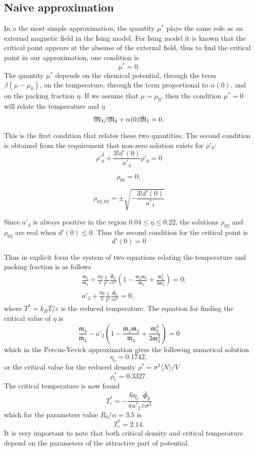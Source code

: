 \subsection{Naive approximation}
In a the most simple approximation, the quantity $\mu^*$ plays the same role as an external magnetic field in the Ising model. For Ising model it is known that the critical point appears at the absense of the external field, thus to find the critical point in our approximation, one condition is 
$$\mu^*=0.$$ 
The quantity $\mu^*$ depends on the chemical potential, through the term $\beta(\mu - \mu_0)$, on the temperature, through the term proportional to $\alpha(0)$, and on the packing fraction $\eta.$
If we assume that $\mu = \mu_0$, then the condition $\mu^*=0$ will relate the temperature and $\eta$
$$
{\frak M_3}/{\frak M_4} + \alpha(0)\tilde{\frak M}_1 = 0.
$$


This is the first condition that relates these two quantities.
The second condition is obtained from the requirement that non-zero solution exists for $\rho'_0$:
$$ {\rho'}^3_0 + \frac{3!d'(0)}{a'_4}{\rho'}_0 = 0 $$

$$
\rho_{01} = 0;
$$ 

$$
\rho_{02,03} = \pm\sqrt{-\frac{3!d'(0)}{a'_4}}
$$

Since $a'_4$ is always positive in the region $0.04 \leq \eta \leq 0.22$, the solutions $\rho_{02}$ and $\rho_{03}$ are real when $d'(0) \leq 0$. Thus the second condition for the critical point is 
$$
d'(0) = 0
$$

Thus in explicit form the system of two equations relating the temperature and packing fraction is as follows
\begin{eqnarray}
	&&\frac{\mathfrak{m}_3}{\mathfrak{m}_4} + \frac{6\eta}{\pi} \frac{1}{T^*} \frac{\hat{\Phi}_0}{\varepsilon\sigma^3}
	\left(1 - \frac{\mathfrak{m}_2\mathfrak{m}_3}{\mathfrak{m}_4} + \frac{\mathfrak{m}_3^3}{3\mathfrak{m}_4^2} \right) = 0;
	\nonumber\\
	&& a'_2 + \frac{6\eta}{\pi} \frac{1}{T^*} \frac{\hat{\Phi}_0}{\varepsilon\sigma^3} = 0,
\end{eqnarray}
where $T^* = k_BT/\varepsilon$ is the reduced temperature.
The equation for finding the critical value of $\eta$ is 
\begin{equation}
	\frac{\mathfrak{m}_3}{\mathfrak{m}_4} - a'_2
	\left(1 - \frac{\mathfrak{m}_2\mathfrak{m}_3}{\mathfrak{m}_4} + \frac{\mathfrak{m}_3^3}{3\mathfrak{m}_4^2} \right) = 0
\end{equation}
which in the Percus-Yevick approximation gives the following numerical solution
$$
\eta_c = 0.1742,
$$
or the critical value for the reduced density $\rho^* = \sigma^3\langle N \rangle / V$
$$
\rho^*_c = 0.3327.
$$
The critical temperature is now found
$$
T^*_c = -\frac{6\eta_c}{\pi a'_2} \frac{\hat{\Phi}_0}{\varepsilon\sigma^3}
$$
which for the parameters value $R_0/\alpha = 3.5$ is
$$
T^*_c = 2.14.
$$
It is very important to note that both critical density and critical temperature depend on the parameters of the attractive part of potential.